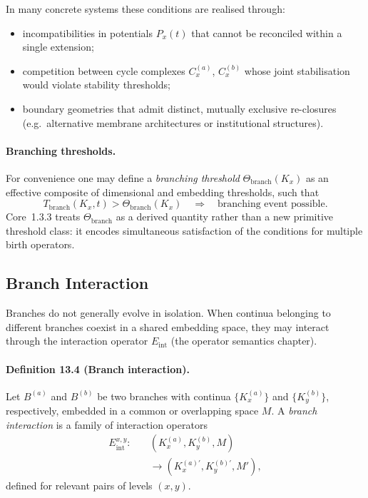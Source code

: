 In many concrete systems these conditions are realised through:
\begin{itemize}
  \item incompatibilities in potentials \(P_x(t)\) that cannot be reconciled
        within a single extension;
  \item competition between cycle complexes \(C_x^{(a)}\), \(C_x^{(b)}\)
        whose joint stabilisation would violate stability thresholds;
  \item boundary geometries that admit distinct, mutually exclusive
        re-closures (e.g.\ alternative membrane architectures or
        institutional structures).
\end{itemize}

\paragraph{Branching thresholds.}
For convenience one may define a \emph{branching threshold}
\(\Theta_{\mathrm{branch}}(K_x)\) as an effective composite of dimensional
and embedding thresholds, such that
\[
  T_{\mathrm{branch}}(K_x,t) > \Theta_{\mathrm{branch}}(K_x)
  \quad\Rightarrow\quad
  \text{branching event possible.}
\]
Core~1.3.3 treats \(\Theta_{\mathrm{branch}}\) as a derived quantity rather
than a new primitive threshold class: it encodes simultaneous satisfaction of
the conditions for multiple birth operators.

\subsection{Branch Interaction}

Branches do not generally evolve in isolation. When continua belonging to
different branches coexist in a shared embedding space, they may interact
through the interaction operator \(E_{\mathrm{int}}\)
(the operator semantics chapter).

\paragraph{Definition 13.4 (Branch interaction).}
Let \(B^{(a)}\) and \(B^{(b)}\) be two branches with continua
\(\{K_x^{(a)}\}\) and \(\{K_y^{(b)}\}\), respectively, embedded in a common or
overlapping space \(M\). A \emph{branch interaction} is a family of interaction
operators
\[
\begin{aligned}
  E_{\mathrm{int}}^{x,y}:\quad
    &(K_x^{(a)}, K_y^{(b)}, M)\\
    &\longrightarrow (K_x^{(a)\prime}, K_y^{(b)\prime}, M'),
\end{aligned}
\]
defined for relevant pairs of levels \((x,y)\).

